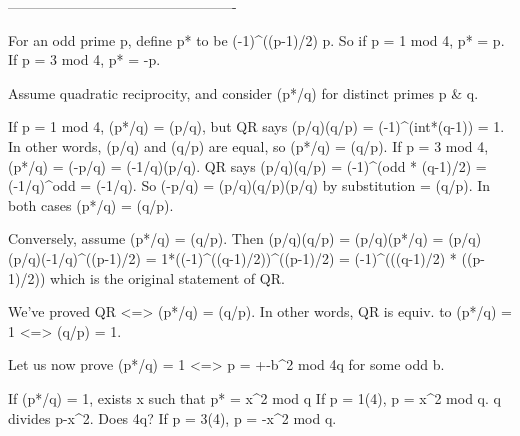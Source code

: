 -------------------------------------------------

For an odd prime p, define p* to be (-1)^((p-1)/2) p. So if p = 1 mod 4, p* = p. If p = 3 mod 4, p* = -p.

Assume quadratic reciprocity, and consider (p*/q) for distinct primes p & q.

If p = 1 mod 4, (p*/q) = (p/q), but QR says (p/q)(q/p) = (-1)^(int*(q-1)) = 1.
  In other words, (p/q) and (q/p) are equal, so (p*/q) = (q/p).
If p = 3 mod 4, (p*/q) = (-p/q) = (-1/q)(p/q). QR says
  (p/q)(q/p) = (-1)^(odd * (q-1)/2)
             = (-1/q)^odd
             = (-1/q).
  So (-p/q) = (p/q)(q/p)(p/q) by substitution
            = (q/p). In both cases (p*/q) = (q/p).

Conversely, assume (p*/q) = (q/p).
Then (p/q)(q/p) = (p/q)(p*/q)
                = (p/q)(p/q)(-1/q)^((p-1)/2)
                = 1*((-1)^((q-1)/2))^((p-1)/2)
                = (-1)^(((q-1)/2) * ((p-1)/2))
which is the original statement of QR.

We've proved QR <=> (p*/q) = (q/p).
In other words, QR is equiv. to (p*/q) = 1 <=> (q/p) = 1.

Let us now prove (p*/q) = 1 <=> p = +-b^2 mod 4q for some odd b.

If (p*/q) = 1, exists x such that p* = x^2 mod q
  If p = 1(4), p = x^2 mod q. q divides p-x^2. Does 4q?
  If p = 3(4), p = -x^2 mod q.

